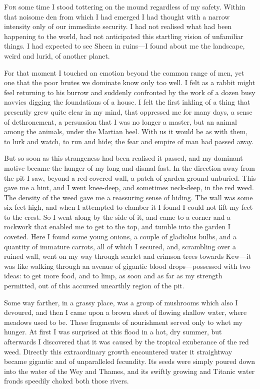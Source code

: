 

\lettrine[lines=4,findent=2pt]{F}{or} some time I stood tottering on the mound regardless of my safety. Within that noisome den from which I had emerged I had thought with a narrow intensity only of our immediate security. I had not realised what had been happening to the world, had not anticipated this startling vision of unfamiliar things. I had expected to see Sheen in ruins—I found about me the landscape, weird and lurid, of another planet.

For that moment I touched an emotion beyond the common range of men, yet one that the poor brutes we dominate know only too well. I felt as a rabbit might feel returning to his burrow and suddenly confronted by the work of a dozen busy navvies digging the foundations of a house. I felt the first inkling of a thing that presently grew quite clear in my mind, that oppressed me for many days, a sense of dethronement, a persuasion that I was no longer a master, but an animal among the animals, under the Martian heel. With us it would be as with them, to lurk and watch, to run and hide; the fear and empire of man had passed away.

But so soon as this strangeness had been realised it passed, and my dominant motive became the hunger of my long and dismal fast. In the direction away from the pit I saw, beyond a red-covered wall, a patch of garden ground unburied. This gave me a hint, and I went knee-deep, and sometimes neck-deep, in the red weed. The density of the weed gave me a reassuring sense of hiding. The wall was some six feet high, and when I attempted to clamber it I found I could not lift my feet to the crest. So I went along by the side of it, and came to a corner and a rockwork that enabled me to get to the top, and tumble into the garden I coveted. Here I found some young onions, a couple of gladiolus bulbs, and a quantity of immature carrots, all of which I secured, and, scrambling over a ruined wall, went on my way through scarlet and crimson trees towards Kew—it was like walking through an avenue of gigantic blood drops—possessed with two ideas: to get more food, and to limp, as soon and as far as my strength permitted, out of this accursed unearthly region of the pit.

Some way farther, in a grassy place, was a group of mushrooms which also I devoured, and then I came upon a brown sheet of flowing shallow water, where meadows used to be. These fragments of nourishment served only to whet my hunger. At first I was surprised at this flood in a hot, dry summer, but afterwards I discovered that it was caused by the tropical exuberance of the red weed. Directly this extraordinary growth encountered water it straightway became gigantic and of unparalleled fecundity. Its seeds were simply poured down into the water of the Wey and Thames, and its swiftly growing and Titanic water fronds speedily choked both those rivers.

